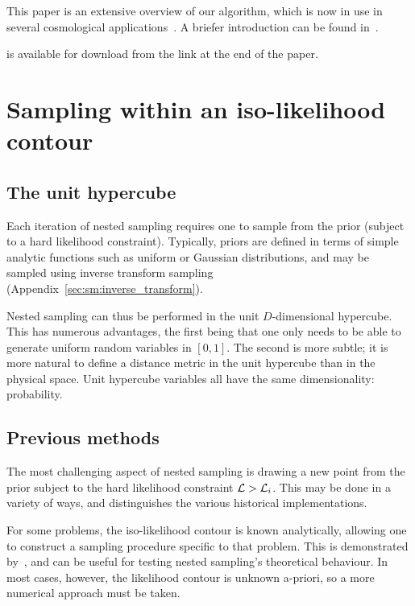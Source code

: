 This paper is an extensive overview of our algorithm, which is now in use in several cosmological applications~\citep{planck2015-a24}. A briefer introduction can be found in~\cite{polychordletter}.

\PolyChord{} is available for download from the link at the end of the paper.







\section{Sampling within an iso-likelihood contour}
\label{sec:pc:iso_likelihood_sampling}

\subsection{The unit hypercube}
\label{sec:bay:unit_hypercube}
Each iteration of nested sampling requires one to sample from the prior (subject to a hard likelihood constraint). 
Typically, priors are defined in terms of simple analytic functions such as uniform or Gaussian distributions, and may be sampled using  inverse transform sampling (Appendix~\ref{sec:sm:inverse_transform}). 

Nested sampling can thus be performed in the unit $D$-dimensional hypercube. This has numerous advantages, the first being that one only needs to be able to generate uniform random variables in $[0,1]$. The second is more subtle; it is more natural to define a distance metric in the unit hypercube than in the physical space. Unit hypercube variables all have the same dimensionality: probability.



\subsection{Previous methods}
\label{sec:pc:previous_methods}
The most challenging aspect of nested sampling is drawing a new point from the prior subject to the hard likelihood constraint $\mathcal{L}>\mathcal{L}_i$. This may be done in a variety of ways, and distinguishes the various historical implementations.

For some problems, the iso-likelihood contour is known analytically, allowing one to construct a sampling procedure specific to that problem. This is demonstrated by~\cite{Keeton}, and can be useful for testing nested sampling's theoretical behaviour. In most cases, however, the likelihood contour is unknown a-priori, so a more numerical approach must be taken.

